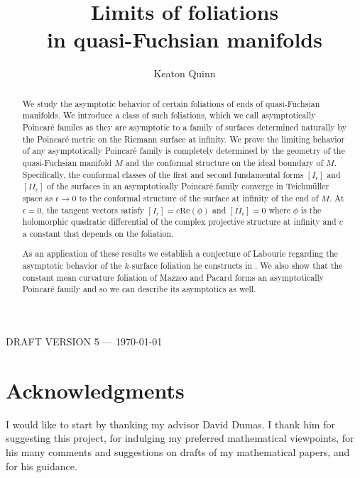 \documentclass{amsart}
\newcommand{\two}{I\!\!I}
\begin{document}
\title{Limits of foliations \\ in quasi-Fuchsian manifolds}

\author{Keaton Quinn}

\maketitle

\begin{center} {\sf DRAFT VERSION 5 --- {\today} } \end{center}

\begin{abstract}
We study the asymptotic behavior of certain foliations of ends of quasi-Fuchsian manifolds. 
We introduce a class of such foliations, which we call asymptotically Poincar\'e familes as they are asymptotic to a family of surfaces determined naturally by the Poincar\'e metric on the Riemann surface at infinity.
We prove the limiting behavior of any asymptotically Poincar\'e family is completely determined by the geometry of the quasi-Fuchsian manifold $M$ and the conformal structure on the ideal boundary of $M$. 
Specifically, the conformal classes of the first and second fundamental forms $[I_\epsilon]$ and $[\two_\epsilon]$ of the surfaces in an asymptotically Poincar\'e family converge in Teichm\"uller space as $\epsilon \to 0$ to the conformal structure of the surface at infinity of the end of $M$.
At $\epsilon  = 0$, the tangent vectors satisfy $\dot{[I_\epsilon]} = c \mathrm{Re}(\phi)$ and $\dot{[\two_\epsilon]} = 0$ where $\phi$ is the holomorphic quadratic differential of the complex projective structure at infinity and $c$ a constant that depends on the foliation. 

As an application of these results we establish a conjecture of Labourie regarding the asymptotic behavior of the $k$-surface foliation he constructs in \cite{labourie1992}.
We also show that the constant mean curvature foliation of Mazzeo and Pacard \cite{mazzeo-pacard2011} forms an asymptotically Poincar\'e family and so we can describe its asymptotics as well. 
\end{abstract}



\section{Acknowledgments}


I would like to start by thanking my advisor David Dumas.
I thank him for suggesting this project, for indulging my preferred mathematical viewpoints, for his many comments and suggestions on drafts of my mathematical papers, and for his guidance.
\end{document}
